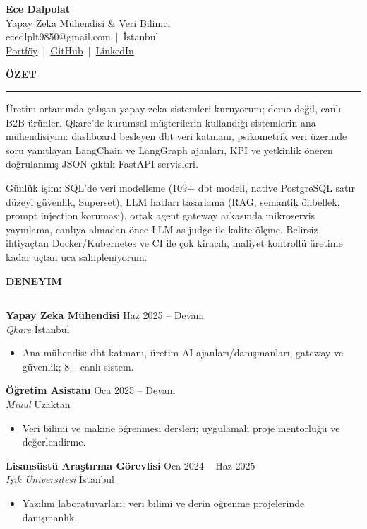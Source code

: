 \documentclass[11pt,a4paper]{article}
\newcommand{\cvsection}[1]{%
  \vspace{1.2em}%
  {\large\textbf{\MakeUppercase{#1}}}\\[0.2em]
  \hrule
  \vspace{0.6em}%
}
\newcommand{\jobentry}[4]{%
  \textbf{#1} \hfill {\small #2}\\
  \textit{#3} \hfill {\small #4}\\[0.2em]
}
\begin{document}
\begin{center}
  {\LARGE \textbf{Ece Dalpolat}}\\[0.4em]
  {\large Yapay Zeka Mühendisi \& Veri Bilimci}\\[0.4em]
  {\small
  ecedlplt9850@gmail.com \,|\, İstanbul\\[0.2em]
  \href{https://ecedalpolat.github.io/ece-dalpolat-portfolio/}{Portföy} \,|\,
  \href{https://github.com/EceDalpolat}{GitHub} \,|\,
  \href{https://www.linkedin.com/in/ece-dalpolat-0265a0221/}{LinkedIn}
  }
\end{center}

\vspace{-0.5em}
\cvsection{Özet}

Üretim ortamında çalışan yapay zeka sistemleri kuruyorum; demo değil, canlı B2B ürünler. Qkare'de kurumsal müşterilerin kullandığı sistemlerin ana mühendisiyim: dashboard besleyen dbt veri katmanı, psikometrik veri üzerinde soru yanıtlayan LangChain ve LangGraph ajanları, KPI ve yetkinlik öneren doğrulanmış JSON çıktılı FastAPI servisleri.

Günlük işim: SQL'de veri modelleme (109+ dbt modeli, native PostgreSQL satır düzeyi güvenlik, Superset), LLM hatları tasarlama (RAG, semantik önbellek, prompt injection koruması), ortak agent gateway arkasında mikroservis yayınlama, canlıya almadan önce LLM-as-judge ile kalite ölçme. Belirsiz ihtiyaçtan Docker/Kubernetes ve CI ile çok kiracılı, maliyet kontrollü üretime kadar uçtan uca sahipleniyorum.

\cvsection{Deneyim}

\jobentry{Yapay Zeka Mühendisi}{Haz 2025 -- Devam}{Qkare}{İstanbul}
\begin{itemize}[leftmargin=1.5em, nosep, topsep=2pt, itemsep=2pt]
  \item Ana mühendis: dbt katmanı, üretim AI ajanları/danışmanları, gateway ve güvenlik; 8+ canlı sistem.
\end{itemize}
\vspace{0.6em}

\jobentry{Öğretim Asistanı}{Oca 2025 -- Devam}{Miuul}{Uzaktan}
\begin{itemize}[leftmargin=1.5em, nosep, topsep=2pt, itemsep=2pt]
  \item Veri bilimi ve makine öğrenmesi dersleri; uygulamalı proje mentörlüğü ve değerlendirme.
\end{itemize}
\vspace{0.6em}

\jobentry{Lisansüstü Araştırma Görevlisi}{Oca 2024 -- Haz 2025}{Işık Üniversitesi}{İstanbul}
\begin{itemize}[leftmargin=1.5em, nosep, topsep=2pt, itemsep=2pt]
  \item Yazılım laboratuvarları; veri bilimi ve derin öğrenme projelerinde danışmanlık.
\end{itemize}
\vspace{0.6em}
\end{document}
